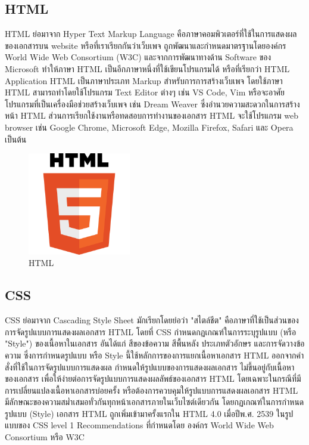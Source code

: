 \subsection{HTML}
HTML \cite{web:html} ย่อมาจาก Hyper Text Markup Language คือภาษาคอมพิวเตอร์ที่ใช้ในการแสดงผลของเอกสารบน website หรือที่เราเรียกกันว่าเว็บเพจ ถูกพัฒนาและกำหนดมาตรฐานโดยองค์กร World Wide Web Consortium (W3C) และจากการพัฒนาทางด้าน Software ของ Microsoft ทำให้ภาษา HTML เป็นอีกภาษาหนึ่งที่ใช้เขียนโปรแกรมได้ หรือที่เรียกว่า HTML Application
HTML เป็นภาษาประเภท Markup สำหรับการการสร้างเว็บเพจ โดยใช้ภาษา HTML สามารถทำโดยใช้โปรแกรม Text Editor ต่างๆ เช่น VS Code, Vim หรือจะอาศัยโปรแกรมที่เป็นเครื่องมือช่วยสร้างเว็บเพจ เช่น Dream Weaver ซึ่งอํานวยความสะดวกในการสร้างหน้า HTML ส่วนการเรียกใช้งานหรือทดสอบการทำงานของเอกสาร HTML จะใช้โปรแกรม web browser เช่น Google Chrome, Microsoft Edge, Mozilla Firefox, Safari และ Opera เป็นต้น
\begin{figure}
    \centering
    \includegraphics[width=0.4\textwidth]{img/html.png}
    \caption{HTML}
    \label{fig:html}
\end{figure}

\newpage
\subsection{CSS}
CSS \cite{web:css} ย่อมาจาก Cascading Style Sheet  มักเรียกโดยย่อว่า "สไตล์ชีต" คือภาษาที่ใช้เป็นส่วนของการจัดรูปแบบการแสดงผลเอกสาร  HTML โดยที่ CSS กำหนดกฏเกณฑ์ในการระบุรูปแบบ (หรือ "Style") ของเนื้อหาในเอกสาร อันได้แก่ สีของข้อความ สีพื้นหลัง ประเภทตัวอักษร และการจัดวางข้อความ ซึ่งการกำหนดรูปแบบ หรือ Style นี้ใช้หลักการของการแยกเนื้อหาเอกสาร HTML ออกจากคำสั่งที่ใช้ในการจัดรูปแบบการแสดงผล กำหนดให้รูปแบบของการแสดงผลเอกสาร ไม่ขึ้นอยู่กับเนื้อหาของเอกสาร เพื่อให้ง่ายต่อการจัดรูปแบบการแสดงผลลัพธ์ของเอกสาร HTML โดยเฉพาะในกรณีที่มีการเปลี่ยนแปลงเนื้อหาเอกสารบ่อยครั้ง หรือต้องการควบคุมให้รูปแบบการแสดงผลเอกสาร HTML มีลักษณะของความสม่ำเสมอทั่วกันทุกหน้าเอกสารภายในเว็บไซต์เดียวกัน  โดยกฏเกณฑ์ในการกำหนดรูปแบบ (Style) เอกสาร HTML ถูกเพิ่มเข้ามาครั้งแรกใน HTML 4.0  เมื่อปีพ.ศ. 2539 ในรูปแบบของ CSS level 1 Recommendations ที่กำหนดโดย องค์กร World Wide Web Consortium หรือ W3C
